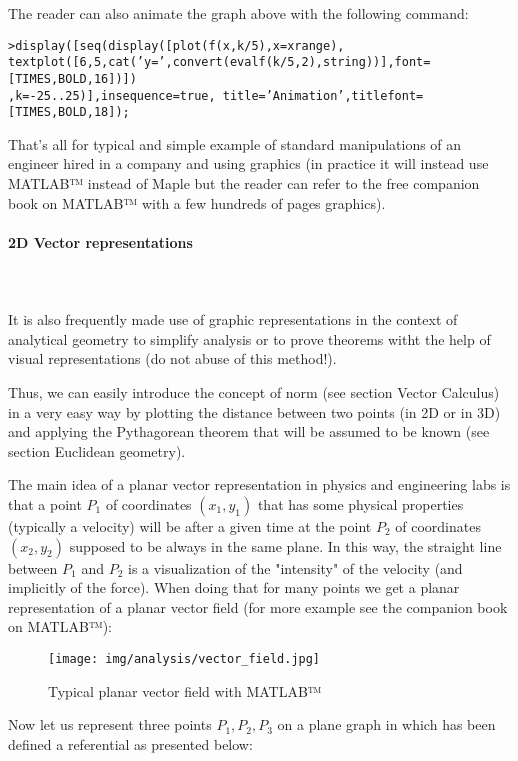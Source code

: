 The reader can also animate the graph above with the following command:

\texttt{>display([seq(display([plot(f(x,k/5),x=xrange),}\\ \texttt{textplot([6,5,cat('y=',convert(evalf(k/5,2),string))],font=[TIMES,BOLD,16])])}\\
\texttt{,k=-25..25)],insequence=true, title='Animation',titlefont=[TIMES,BOLD,18]);}

That's all for typical and simple example of standard manipulations of an engineer hired in a company and using graphics (in practice it will instead use MATLAB™ instead of Maple but the reader can refer to the free companion book on MATLAB™ with a few hundreds of pages graphics).

\paragraph{2D Vector representations}\mbox{}\\\\
It is also frequently made use of graphic representations in the context of analytical geometry to simplify analysis or to prove theorems witht the help of visual representations (do not abuse of this method!).

Thus, we can easily introduce the concept of norm (see section Vector Calculus) in a very easy way by plotting the distance between two points (in 2D or in 3D) and applying the Pythagorean theorem that will be assumed to be known (see section Euclidean geometry).

The main idea of a planar vector representation in physics and engineering labs is that  a point $P_1$ of coordinates $(x_1,y_1)$ that has some physical properties (typically a velocity) will be after a given time at the point $P_2$ of coordinates $(x_2,y_2)$ supposed to be always in the same plane. In this way, the straight line between $P_1$ and $P_2$ is a visualization of the "intensity" of the velocity (and implicitly of the force). When doing that for many points we get a planar representation of a planar vector field (for more example see the companion book on MATLAB™):

\begin{figure}[H]
\centering
\texttt{[image: img/analysis/vector\_field.jpg]}
\caption[]{Typical planar vector field with MATLAB™}
\end{figure}


Now let us represent three points $P_1,P_2,P_3$ on a plane graph in which has been defined a referential as presented below:


